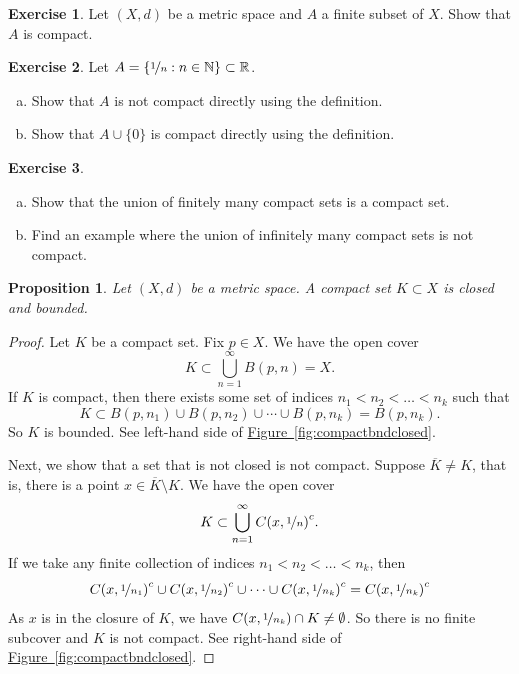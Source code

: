 \documentclass[12pt,openany]{book}
\newcommand{\widebar}[1]{\overline{#1}}
\newcommand{\R}{{\mathbb{R}}}
\newcommand{\N}{{\mathbb{N}}}
\theoremstyle{plain}
\newtheorem{prop}[thm]{Proposition}
\theoremstyle{remark}
\theoremstyle{definition}
\newenvironment{exbox}{%
    \def\FrameCommand{\vrule width 1pt \relax\hspace{10pt}}%
    \MakeFramed{\advance\hsize-\width\FrameRestore}%
}{%
    \endMakeFramed
}
\newenvironment{exparts}{%
    \leavevmode\begin{enumerate}[a),noitemsep,topsep=0pt,parsep=0pt,partopsep=0pt]
}{%
    \end{enumerate}
}
\theoremstyle{exercise}
\newtheorem{exercise}{Exercise}[section]
\theoremstyle{example}
\newcommand{\figureref}[1]{\hyperref[#1]{Figure~\ref*{#1}}}
\begin{document}
\begin{exbox}
\begin{exercise}
Let $(X,d)$ be a metric space and $A$ a finite subset of $X$.
Show that $A$ is compact.
\end{exercise}

\begin{exercise}
Let $A = \{ \nicefrac{1}{n} : n \in \N \} \subset \R$.
\begin{exparts}
\item
Show that $A$ is
not compact directly using the definition.
\item
Show that $A \cup \{ 0 \}$ is
compact directly using the definition.
\end{exparts}
\end{exercise}

\begin{exercise}
\begin{exparts}
\item
Show that the union of finitely many compact sets is a compact set.
\item
Find an example where the union of infinitely many compact sets is not
compact.
\end{exparts}
\end{exercise}
\end{exbox}

\begin{prop}
Let $(X,d)$ be a metric space.  A compact set $K \subset X$ is closed and
bounded.
\end{prop}

\begin{proof}
Let $K$ be a compact set.
Fix $p \in X$.  We have the open cover
\begin{equation*}
K \subset \bigcup_{n=1}^\infty B(p,n) = X .
\end{equation*}
If $K$ is compact, then there exists some set of indices
$n_1 < n_2 < \ldots < n_k$ such that
\begin{equation*}
K \subset
B(p,n_1)
\cup
B(p,n_2)
\cup \cdots \cup
B(p,n_k)
= B(p,n_k) .
\end{equation*}
So $K$ is bounded.
See left-hand side of \figureref{fig:compactbndclosed}.

Next, we show that a set that is not closed is not compact.  Suppose 
$\widebar{K} \neq K$, that is, there is a point $x \in \widebar{K}
\setminus K$.
We have the open cover
\begin{equation*}
K \subset \bigcup_{n=1}^\infty {C(x,\nicefrac{1}{n})}^c .
\end{equation*}
If we take any
finite collection of indices $n_1 < n_2 < \ldots < n_k$, then 
\begin{equation*}
{C(x,\nicefrac{1}{n_1})}^c 
\cup
{C(x,\nicefrac{1}{n_2})}^c 
\cup \cdots \cup
{C(x,\nicefrac{1}{n_k})}^c 
=
{C(x,\nicefrac{1}{n_k})}^c 
\end{equation*}
As $x$ is in the closure of $K$,
we have
$C(x,\nicefrac{1}{n_k}) \cap K \neq \emptyset$.  So there is no
finite subcover and $K$ is not compact.
See right-hand side of \figureref{fig:compactbndclosed}.
\end{proof}
\end{document}
